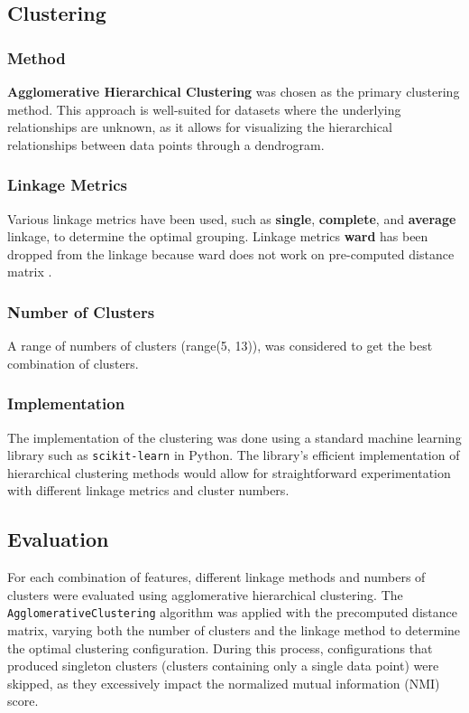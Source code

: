 \subsection{Clustering}

\subsubsection{Method}
\textbf{Agglomerative Hierarchical Clustering} was chosen as the primary clustering method. This approach is well-suited for datasets where the underlying relationships are unknown, as it allows for visualizing the hierarchical relationships between data points through a dendrogram.

\subsubsection{Linkage Metrics}
Various linkage metrics have been used, such as \textbf{single}, \textbf{complete}, and \textbf{average} linkage, to determine the optimal grouping. Linkage metrics \textbf{ward} has been dropped from the linkage because ward does not work on pre-computed distance matrix \cite{sklearn_AgglomerativeClustering}.

\subsubsection{Number of Clusters}
A range of numbers of clusters (range(5, 13)), was considered to get the best combination of clusters.

\subsubsection{Implementation}
The implementation of the clustering was done using a standard machine learning library such as \texttt{scikit-learn} in Python. The library’s efficient implementation of hierarchical clustering methods would allow for straightforward experimentation with different linkage metrics and cluster numbers.

\subsection{Evaluation}
For each combination of features, different linkage methods and numbers of clusters were evaluated using agglomerative hierarchical clustering. The \texttt{AgglomerativeClustering} algorithm was applied with the precomputed distance matrix, varying both the number of clusters and the linkage method to determine the optimal clustering configuration. During this process, configurations that produced singleton clusters (clusters containing only a single data point) were skipped, as they excessively impact the normalized mutual information (NMI) score.

